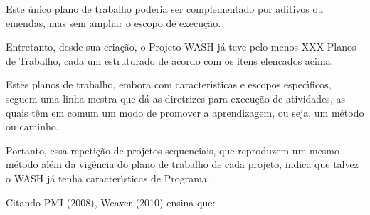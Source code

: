 \documentclass[
12pt,		%
openright,	%
twoside,  %
a4paper,			%
chapter=TITLE,		%
english,			%
french,				%
spanish,			%
brazil				%
]{USPSC-classe/USPSC}
\begin{document}
Este \'unico plano de trabalho poderia ser complementado por aditivos ou emendas, mas sem ampliar o escopo de execu\c{c}\~ao.














Entretanto, desde sua cria\c{c}\~ao, o Projeto WASH j\'a teve pelo menos XXX Planos de Trabalho, cada um estruturado de acordo com os itens elencados acima.














Estes planos de trabalho, embora com caracter\'{\i}sticas e escopos espec\'{\i}ficos, seguem uma linha mestra que d\'a as diretrizes para execu\c{c}\~ao de atividades, as quais t\^em em comum um modo de promover a aprendizagem, ou seja, um m\'etodo ou \textquotedbl caminho\textquotedbl .














Portanto, essa repeti\c{c}\~ao de projetos sequenciais, que reproduzem um mesmo m\'etodo al\'em da vig\^encia do plano de trabalho de cada projeto, indica que talvez o WASH j\'a tenha caracter\'{\i}sticas de Programa.














Citando  PMI (2008), Weaver (2010) ensina que:















\noindent\begin{center}\mbox{\centering{}}\end{center}
\end{document}
